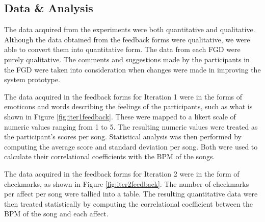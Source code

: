 

\subsection{Data \& Analysis}
The data acquired from the experiments were both quantitative and qualitative. Although the data obtained from the feedback forms were qualitative, we were able to convert them into quantitative form. The data from each FGD were purely qualitative. The comments and suggestions made by the participants in the FGD were taken into consideration when changes were made in improving the system prototype.

The data acquired in the feedback forms for Iteration 1 were in the forms of emoticons and words describing the feelings of the participants, such as what is shown in Figure \ref{fig:iter1feedback}. These were mapped to a likert scale of numeric values ranging from 1 to 5. The resulting numeric values were treated as the participant's scores per song. Statistical analysis was then performed by computing the average score and standard deviation per song. Both were used to calculate their correlational coefficients with the BPM of the songs.

The data acquired in the feedback forms for Iteration 2 were in the form of checkmarks, as shown in Figure \ref{fig:iter2feedback}. The number of checkmarks per affect per song were tallied into a table. The resulting quantitative data were then treated statistically by computing the correlational coefficient between the BPM of the song and each affect.

